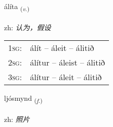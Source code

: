\documentclass[frontgrid, backgrid]{flacards}\usepackage[]{graphicx}\usepackage[]{color}
\begin{document}
\renewcommand{\flhead}{\vskip5pt \fboxsep=0pt {\small\bfseries\footnotesize Sagnorð | 动词}}
\renewcommand{\fcfoot}{\vskip5pt \fboxsep=0pt \hspace{2pt}{\small\bfseries\footnotesize 2K}}

\renewcommand{\blhead}{\vskip5pt {\small\bfseries\footnotesize Sagnorð | 动词 }}
\renewcommand{\bcfoot}{\vskip5pt \hspace{2pt}{\small\bfseries\footnotesize 2K}}


{álíta \small{\textsubscript{(\textit{v.})}} \\[1ex] %
\textphonetic{[auːlita]} \\
zh: \emph{认为，假设} \\  [2ex]
\renewcommand*{\arraystretch}{0.8}
\begin{tabular}{p{1cm}l}
\textsc{1sg}: & álít -- áleit -- álitið \\ 
\textsc{2sg}: & álítur -- áleist -- álitið \\ 
\textsc{3sg}: & álítur -- áleit -- álitið \\ 
\end{tabular}
}

\renewcommand{\flhead}{\vskip5pt \fboxsep=0pt {\small\bfseries\footnotesize Nafnorð | 名词}}
\renewcommand{\fcfoot}{\vskip5pt \fboxsep=0pt \hspace{2pt}{\small\bfseries\footnotesize 2K}}

\renewcommand{\blhead}{\vskip5pt {\small\bfseries\footnotesize Nafnorð | 名词 }}
\renewcommand{\bcfoot}{\vskip5pt \hspace{2pt}{\small\bfseries\footnotesize 2K}}


{ljósmynd \small{\textsubscript{(\textit{f.})}} \\[1ex] %
\textphonetic{[ljousmɪnt]} \\
zh: \emph{照片} \\  [2ex]
\renewcommand*{\arraystretch}{0.8}
}
\end{document}
